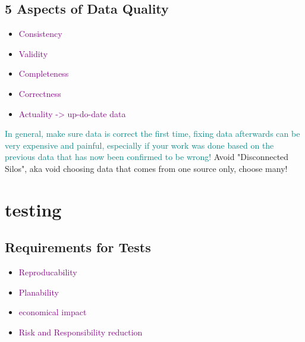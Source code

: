 \documentclass[main.tex,fontsize=12pt,paper=a4,paper=landscape,DIV=calc,]{scrartcl}
\begin{document}
\begin{multicols*}{2}
\subsection{5 Aspects of Data Quality}
\begin{itemize}
\item \textcolor{purple}{Consistency}
\item \textcolor{purple}{Validity}
\item \textcolor{purple}{Completeness}
\item \textcolor{purple}{Correctness}
\item \textcolor{purple}{Actuality -> up-do-date data}
\end{itemize} 
\textcolor{teal}{In general, make sure data is correct the first time, fixing data afterwards can be very expensive and painful, especially if your work was done based on the previous data that has now been confirmed to be wrong!}\newline
Avoid "Disconnected Silos", aka void choosing data that comes from one source only, choose many!

\section{testing}

\subsection{Requirements for Tests}
\begin{itemize}
\item \textcolor{purple}{Reproducability}
\item \textcolor{purple}{Planability}
\item \textcolor{purple}{economical impact}
\item \textcolor{purple}{Risk and Responsibility reduction}
\end{itemize} 


\end{multicols*}
\end{document}
